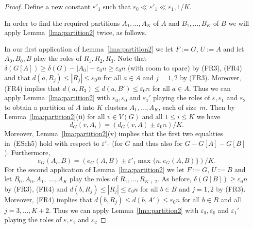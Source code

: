 \documentclass{memo-l}
\def\COMMENT#1{}
\def\eps{\varepsilon}
\def\epszero{\eps_0}
\numberwithin{section}{chapter}
\numberwithin{equation}{section}
\numberwithin{firstthm}{section}
\numberwithin{figure}{section}
\begin{document}
\begin{proof}
Define a new constant $\eps'_1$  such that $\eps_0 \ll  \eps'_1 \ll \eps_1,1/K$.%
   \COMMENT{Before, we also had: "Let $A'_0$ be the set of  vertices $v\in A_0$ for which $d(v,B) \ge \epszero n$ and set $A''_0 := A_0 \setminus A'_0$.
Similarly let $B'_0$ be the set of  vertices $v\in B_0$ for which $d(v,A) \ge \epszero n$ and set $B''_0 := B_0 \setminus B'_0$."
But I don't think that this partition is necessary.
Moreover, before, we have $\eps'_1 = \eps_0$ and $\eps_0 \ll  \eps''_1 \ll \eps_1,1/K$. I have found the definition of $\eps''_1$ redundant.
So we just define $\eps_0 \ll  \eps'_1 \ll \eps_1,1/K$.
}
In order to find the required partitions $A_1,\dots,A_K$ of $A$ and $B_1,\dots,B_K$ of $B$
we will apply Lemma~\ref{lma:partition2} twice, as follows. 

In our first application of Lemma~\ref{lma:partition2} we let $F:=G$, $U:=A$ and let $A_0,B_0,B$ play the roles of $R_1, R_2,R_3$.
Note that $\delta(G[A]) \ge  \delta(G)-|A_0|-\eps_0 n\ge \eps_0 n$ (with room to spare) by (FR3), (FR4) and that
$d(a,R_j)\le |R_j|\le \eps_0 n$ for all $a\in A$ and $j=1,2$ by (FR3).
Moreover, (FR4) implies that $d(a,R_3)\le d(a,B') \le \eps_0 n$ for all $a\in A$.
Thus we can apply Lemma~\ref{lma:partition2} with $ \epszero , \eps_0$ and $ \eps_1'$ playing the roles of $\eps, \eps _1$ and $\eps _2$
to obtain a partition of $A$ into $K$ clusters $A_1,\dots,A_K$, each of size~$m$.
Then by Lemma~\ref{lma:partition2}(ii) for all $v \in V(G)$ and all $1 \le i \le K$ we have 
\begin{equation}\label{eq:dvAi}
d_G(v,A_i) = (d_G(v,A) \pm \eps_0 n)/K.
\end{equation}
Moreover, Lemma~\ref{lma:partition2}(v) implies that the first two equalities in~(ESch5) hold 
with respect to $\eps ' _1$ (for $G$ and thus also for $G - G[A] - G[B]$).
Furthermore,
\begin{equation}\label{eq:eAiB}
e_G(A_i, B)=(e_G(A, B) \pm \eps'_1 \max\{n, e_G(A, B)\})/K.
\end{equation}
For the second application of Lemma~\ref{lma:partition2} we let $F:=G$, $U:=B$ and let
$B_0,A_0,A_1,$ $\dots,A_K$  play the roles of $R_1, \dots ,R_{K+2}$.
As before, $\delta(G[B]) \ge \eps_0 n$ by (FR3), (FR4) and $d(b,R_j)\le |R_j|\le \eps_0 n$ for all $b\in B$ and $j=1,2$ by (FR3).
Moreover, (FR4) implies that $d(b,R_j)\le d(b,A')\le \eps_0 n$ for all $b\in B$ and all $j=3,\dots,K+2$.
Thus we can apply Lemma~\ref{lma:partition2} with $ \epszero , \eps_0$ and $ \eps_1'$ playing the roles of $\eps, \eps _1$ and $\eps _2$

\end{proof}
\end{document}
